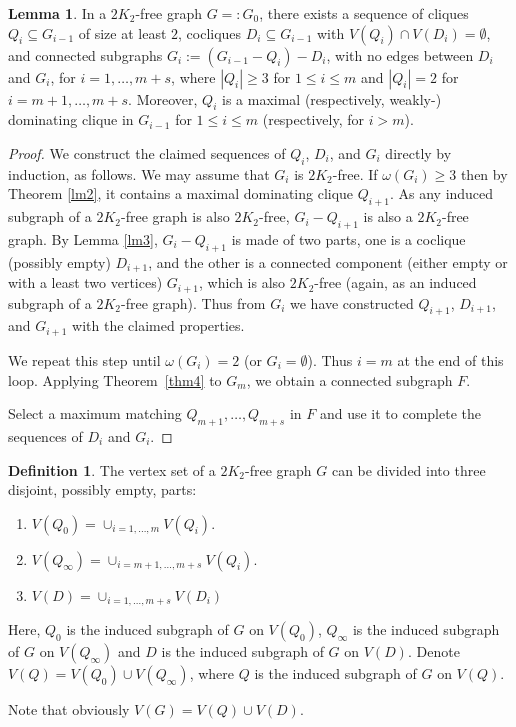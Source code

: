 \documentclass{amsart}
\theoremstyle{definition}
\newtheorem{lemma}{Lemma}
\newtheorem{definition}{Definition}
\begin{document}
\begin{lemma}\label{lm5}
In a $2K_2$-free graph $G=:G_0$, there exists a sequence of cliques
$Q_i\subseteq G_{i-1}$ of size at least $2$, cocliques $D_i\subseteq G_{i-1}$
with $V(Q_i)\cap V(D_i)=\emptyset$,  
and connected subgraphs $G_{i}:=(G_{i-1}-Q_{i})-D_{i}$, with
no edges between $D_i$ and $G_i$,  for
$i=1,\ldots,m+s$, where
$|Q_i|\ge3$ for $1\le i\le m$ and $|Q_i|=2$ for $i=m+1,\ldots,m+s$.
Moreover, $Q_i$ is a maximal
(respectively, weakly-) dominating
clique in $G_{i-1}$ for $1\leq i\leq m$ (respectively, for $i>m$).
\end{lemma}
\begin{proof}
We construct the claimed sequences of $Q_i$, $D_i$, 
and $G_i$ directly by induction, as follows. 
We may assume that $G_i$ is $2K_2$-free.
If $\omega(G_i)\ge3$ then by Theorem \ref{lm2}, it contains a 
maximal dominating clique $Q_{i+1}$.
As any induced subgraph of a $2K_2$-free
graph is also $2K_2$-free, $G_i-Q_{i+1}$ is also a $2K_2$-free graph.
By Lemma \ref{lm3}, $G_i-Q_{i+1}$ is made of two parts, one is a coclique
(possibly empty) $D_{i+1}$, and the other is a connected
component (either empty or with a least two vertices) $G_{i+1}$, which is also
$2K_2$-free (again, as an induced subgraph of a $2K_2$-free graph).
Thus from $G_i$ we have constructed $Q_{i+1}$, $D_{i+1}$, and $G_{i+1}$
with the  claimed properties.

We repeat this step until $\omega(G_i)=2$ (or $G_i=\emptyset$).
Thus $i=m$ at the end of this loop.
Applying Theorem~\ref{thm4} to $G_m$, we obtain
a connected subgraph $F$.%

Select a maximum matching $Q_{m+1},\dots, Q_{m+s}$ in $F$
and use it to complete the sequences of $D_i$ and $G_i$. 
\end{proof}


\begin{definition}\label{lm6}
The vertex set of a $2K_2$-free graph $G$ can be divided into three disjoint, 
possibly empty, parts:
\begin{enumerate}
\item $V(Q_0)=\cup_{i=1,\ldots,m}V(Q_i).$\label{Vq0}
\item $V(Q_{\infty})=\cup_{i=m+1,\ldots,m+s}V(Q_i).$\label{Vqinfty}
\item $V(D)=\cup_{i=1,\ldots,m+s}V(D_i)$\label{Vd}
\end{enumerate}
Here, $Q_0$ is the induced subgraph of $G$ on $V(Q_0)$, $Q_{\infty}$ is the induced subgraph of $G$ on $V(Q_{\infty})$ and $D$ is the induced subgraph of $G$ on $V(D)$. 
Denote $V(Q)=V(Q_0)\cup V(Q_{\infty})$, where $Q$ is the induced subgraph of $G$ on $V(Q)$. 
\end{definition}
Note that obviously $V(G)=V(Q)\cup V(D)$.
\end{document}
